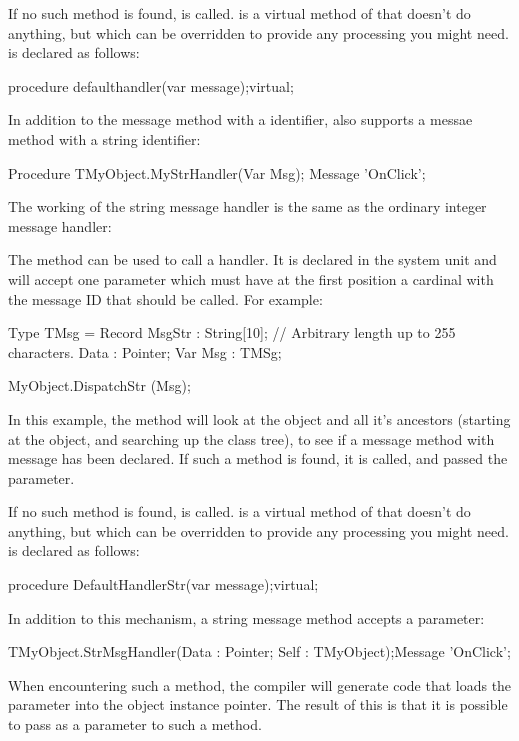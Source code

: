 \documentclass{report}
\begin{document}
If no such method is found,  is called.
 is a virtual method of  that doesn't do 
anything, but which can be overridden to provide any processing you might
need.  is declared as follows:
\begin{listing}
   procedure defaulthandler(var message);virtual;
\end{listing}

In addition to the message method with a  identifier,
\fpc also supports a messae method with a string identifier:
\begin{listing}
 Procedure TMyObject.MyStrHandler(Var Msg); Message 'OnClick';
\end{listing}

The working of the string message handler is the same as the ordinary
integer message handler:

The  method can be used to call a 
handler. It is declared in the system unit and will accept one parameter
which must have at the first position a cardinal with the message ID that
should be called. For example:
\begin{listing}
Type 
  TMsg = Record
    MsgStr : String[10]; // Arbitrary length up to 255 characters.
    Data : Pointer;
Var
  Msg : TMSg;

MyObject.DispatchStr (Msg);
\end{listing}
In this example, the  method will look at the object and 
all it's ancestors (starting at the object, and searching up the class tree), 
to see if a message method with message  has been
declared. If such a method is found, it is called, and passed the 
 parameter.

If no such method is found,  is called.
 is a virtual method of  that doesn't do 
anything, but which can be overridden to provide any processing you might
need.  is declared as follows:
\begin{listing}
   procedure DefaultHandlerStr(var message);virtual;
\end{listing}

In addition to this mechanism, a string message method accepts a 
parameter:
\begin{listing}
  TMyObject.StrMsgHandler(Data : Pointer; Self : TMyObject);Message 'OnClick';
\end{listing}
When encountering such a method, the compiler will generate code that loads
the  parameter into the object instance pointer. The result of
this is that it is possible to pass  as a parameter to such a
method. 
\end{document}
